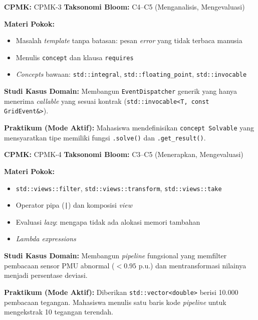 \documentclass[12pt,a4paper]{article}
\begin{document}
\begin{tcolorbox}[colback=white, colframe=uniblue, title={\textbf{Minggu 10: C++20 \textit{Concepts} \& Batasan Tipe}}, fonttitle=\bfseries\color{white}, coltitle=white, colbacktitle=uniblue]
\textbf{CPMK:} CPMK-3 \hfill \textbf{Taksonomi Bloom:} C4--C5 (Menganalisis, Mengevaluasi)

\textbf{Materi Pokok:}
\begin{itemize}[nosep]
    \item Masalah \textit{template} tanpa batasan: pesan \textit{error} yang tidak terbaca manusia
    \item Menulis \texttt{concept} dan klausa \texttt{requires}
    \item \textit{Concepts} bawaan: \texttt{std::integral}, \texttt{std::floating\_point}, \texttt{std::invocable}
\end{itemize}

\textbf{Studi Kasus Domain:}
Membangun \texttt{EventDispatcher} generik yang hanya menerima \textit{callable} yang sesuai kontrak (\texttt{std::invocable<T, const GridEvent\&>}).

\textbf{Praktikum (Mode Aktif):}
Mahasiswa mendefinisikan \texttt{concept Solvable} yang mensyaratkan tipe memiliki fungsi \texttt{.solve()} dan \texttt{.get\_result()}.
\end{tcolorbox}

\begin{tcolorbox}[colback=white, colframe=uniblue, title={\textbf{Minggu 11: C++20 \textit{Ranges} \& Pemrosesan Data Fungsional}}, fonttitle=\bfseries\color{white}, coltitle=white, colbacktitle=uniblue]
\textbf{CPMK:} CPMK-4 \hfill \textbf{Taksonomi Bloom:} C3--C5 (Menerapkan, Mengevaluasi)

\textbf{Materi Pokok:}
\begin{itemize}[nosep]
    \item \texttt{std::views::filter}, \texttt{std::views::transform}, \texttt{std::views::take}
    \item Operator pipa (\texttt{|}) dan komposisi \textit{view}
    \item Evaluasi \textit{lazy}: mengapa tidak ada alokasi memori tambahan
    \item \textit{Lambda expressions}
\end{itemize}

\textbf{Studi Kasus Domain:}
Membangun \textit{pipeline} fungsional yang memfilter pembacaan sensor PMU abnormal ($< 0.95$ p.u.) dan mentransformasi nilainya menjadi persentase deviasi.

\textbf{Praktikum (Mode Aktif):}
Diberikan \texttt{std::vector<double>} berisi 10.000 pembacaan tegangan. Mahasiswa menulis satu baris kode \textit{pipeline} untuk mengekstrak 10 tegangan terendah.
\end{tcolorbox}
\end{document}
